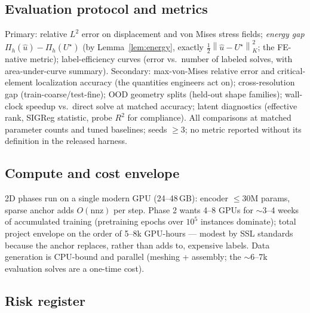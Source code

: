 \documentclass[11pt]{article}
\newcommand{\norm}[1]{\left\lVert #1 \right\rVert}
\begin{document}
\subsection{Evaluation protocol and metrics}
\label{sec:metrics}

Primary: relative $L^2$ error on displacement and von Mises stress fields;
\emph{energy gap} $\Pi_h(\hat u)-\Pi_h(U^\star)$ (by Lemma~\ref{lem:energy},
exactly $\tfrac12\norm{\hat u-U^\star}_K^2$; the FE-native metric);
label-efficiency curves (error vs.\ number of labeled solves, with area-under-curve
summary). Secondary: max-von-Mises relative error and critical-element
localization accuracy (the quantities engineers act on); cross-resolution
gap (train-coarse/test-fine); OOD geometry splits (held-out shape families);
wall-clock speedup vs.\ direct solve at matched accuracy; latent diagnostics
(effective rank, SIGReg statistic, probe $R^2$ for compliance). All
comparisons at matched parameter counts and tuned baselines; seeds $\ge 3$;
no metric reported without its definition in the released harness.

\subsection{Compute and cost envelope}

2D phases run on a single modern GPU (24--48\,GB): encoder $\le 30$M params,
sparse anchor adds $O(\mathrm{nnz})$ per step. Phase 2 wants 4--8 GPUs for
$\sim$3--4 weeks of accumulated training (pretraining epochs over $10^5$
instances dominate); total project envelope on the order of 5--8k GPU-hours
--- modest by SSL standards because the anchor replaces, rather than adds to,
expensive labels. Data generation is CPU-bound and parallel (meshing +
assembly; the $\sim$6--7k evaluation solves are a one-time cost).

\subsection{Risk register}
\end{document}
